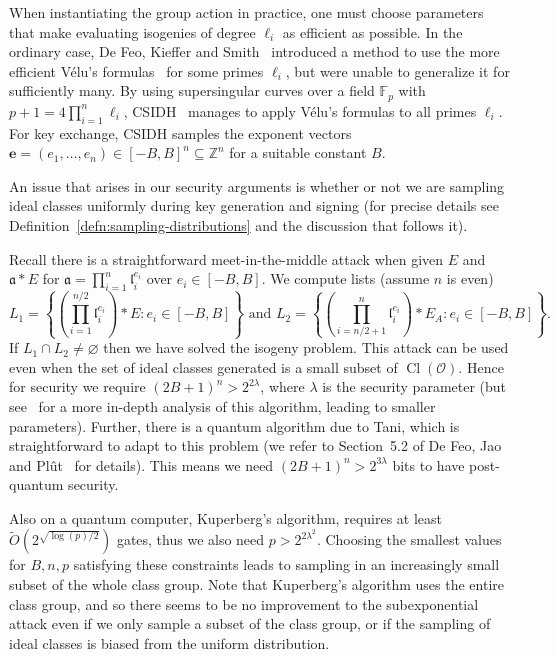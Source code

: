 \documentclass{llncs}
\newcommand{\F}{\mathbb{F}}
\newcommand{\OO}{\mathcal{O}}
\newcommand{\Z}{\mathbb{Z}}
\DeclareMathOperator{\Cl}{Cl}
\renewcommand{\a}{\mathfrak{a}}
\renewcommand{\l}{\mathfrak{l}}
\newcommand{\e}{\mathbf{e}}
\begin{document}
When instantiating the group action in practice, one must choose parameters that make evaluating isogenies of degree $\ell_i$ as efficient as possible.
In the ordinary case, De Feo, Kieffer and Smith~\cite{DFKS18} introduced a method to use the more efficient V\'elu's formulas~\cite{velu71} for some primes $\ell_i$, but were unable to generalize it for sufficiently many.
By using supersingular curves over a field $\F_p$ with $p+1 = 4\prod_{i=1}^n\ell_i$, CSIDH~\cite{CLMPR18} manages to apply V\'elu's formulas to all primes $\ell_i$.
For key exchange, CSIDH samples the exponent vectors $\e = (e_1, \dots, e_n) \in [-B,B]^n \subseteq \Z^n$ for a suitable constant $B$.



An issue that arises in our security arguments is whether or not we are sampling ideal classes uniformly during key generation and signing (for precise details see Definition~\ref{defn:sampling-distributions} and the discussion that follows it).

Recall there is a straightforward meet-in-the-middle attack when given $E$ and $\a * E$ for $\a = \prod_{i=1}^n \l_i^{e_i}$ over $e_i \in [-B, B]$.
We compute lists (assume $n$ is even)
\[
   L_1 = \left\{ \left( \prod_{i=1}^{n/2} \l_i^{e_i} \right) * E : e_i \in [-B,B] \right\} \text{ \ \  and \ \  }
   L_2 = \left\{ \left( \prod_{i=n/2 + 1}^{n} \l_i^{e_i} \right) * E_A : e_i \in [-B,B] \right\}.
\]
If $L_1 \cap L_2 \ne \varnothing$ then we have solved the isogeny problem.
This attack can be used even when the set of ideal classes generated is a small subset of $\Cl( \OO )$.
Hence for security we require $(2B+1)^n > 2^{2 \lambda}$, where $\lambda$ is the security parameter (but see~\cite{adj+menezes+al-isogenies} for a more in-depth analysis of this algorithm, leading to smaller parameters).
Further, there is a quantum algorithm due to Tani, which is straightforward to adapt to this problem (we refer to Section~5.2 of  De Feo, Jao and Pl{\^{u}}t~\cite{FJP14} for details).
This means we need $(2B+1)^n > 2^{3 \lambda}$ bits to have post-quantum security.

Also on a quantum computer, Kuperberg's algorithm, requires at least $\tilde{O}( 2^{\sqrt{\log(p)/2}} )$ gates, thus we also need $p>2^{2\lambda^2}$.
Choosing the smallest values for $B,n,p$ satisfying these constraints leads to sampling in an increasingly small subset of the whole class group.
Note that Kuperberg's algorithm uses the entire class group, and so there seems to be no improvement to the subexponential attack even if we only sample a subset of the class group, or if the sampling of ideal classes is biased from the uniform distribution.
\end{document}
